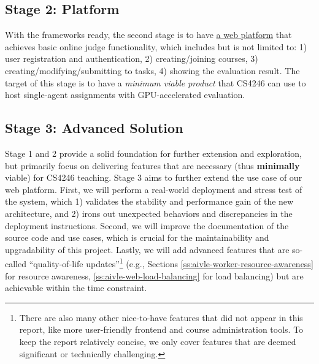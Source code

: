 \subsection{Stage 2: Platform}
With the frameworks ready, the second stage is to have \hyperref[ch:aivle-web]{a web platform} that achieves basic online judge functionality, which includes but is not limited to: 1) user registration and authentication, 2) creating/joining courses, 3) creating/modifying/submitting to tasks, 4) showing the evaluation result. The target of this stage is to have a \emph{minimum viable product} that CS4246 can use to host single-agent assignments with GPU-accelerated evaluation.

\subsection{Stage 3: Advanced Solution}
Stage 1 and 2 provide a solid foundation for further extension and exploration, but primarily focus on delivering features that are necessary (thus \textbf{minimally} viable) for CS4246 teaching. Stage 3 aims to further extend the use case of our web platform. First, we will perform a real-world deployment and stress test of the system, which 1) validates the stability and performance gain of the new architecture, and 2) irons out unexpected behaviors and discrepancies in the deployment instructions. Second, we will improve the documentation of the source code and use cases, which is crucial for the maintainability and upgradability of this project. Lastly, we will add advanced features that are so-called ``quality-of-life updates''\footnote{There are also many other nice-to-have features that did not appear in this report, like more user-friendly frontend and course administration tools. To keep the report relatively concise, we only cover features that are deemed significant or technically challenging.} (e.g., Sections \ref{ss:aivle-worker-resource-awareness} for resource awareness, \ref{ss:aivle-web-load-balancing} for load balancing) but are achievable within the time constraint.
